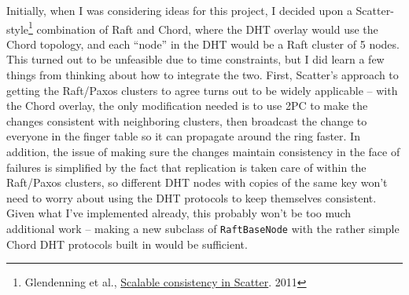 \documentclass[psamsfonts]{amsart}
\begin{document}
Initially, when I was considering ideas for this project, I decided upon a Scatter-style\footnote{Glendenning et al., \href{http://homes.cs.washington.edu/~arvind/papers/scatter.pdf}{Scalable consistency in Scatter}. 2011} combination of Raft and Chord, where the DHT overlay would use the Chord topology, and each ``node'' in the DHT would be a Raft cluster of 5 nodes. This turned out to be unfeasible due to time constraints, but I did learn a few things from thinking about how to integrate the two. First, Scatter's approach to getting the Raft/Paxos clusters to agree turns out to be widely applicable -- with the Chord overlay, the only modification needed is to use 2PC to make the changes consistent with neighboring clusters, then broadcast the change to everyone in the finger table so it can propagate around the ring faster. In addition, the issue of making sure the changes maintain consistency in the face of failures is simplified by the fact that replication is taken care of within the Raft/Paxos clusters, so different DHT nodes with copies of the same key won't need to worry about using the DHT protocols to keep themselves consistent. Given what I've implemented already, this probably won't be too much additional work -- making a new subclass of \verb|RaftBaseNode| with the rather simple Chord DHT protocols built in would be sufficient.
\end{document}

